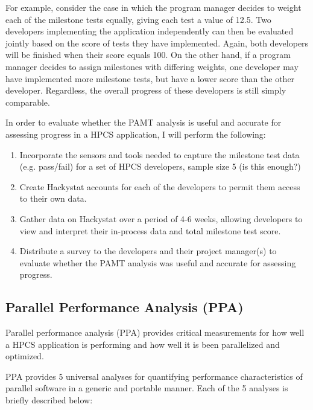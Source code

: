 \documentclass[11pt,twocolumn]{article}
\begin{document}
For example, consider the case in which the program manager decides to
weight each of the milestone tests equally, giving each test a value
of 12.5.  Two developers implementing the application independently
can then be evaluated jointly based on the score of tests they have
implemented.  Again, both developers will be finished when their score
equals 100.  On the other hand, if a program manager decides to assign
milestones with differing weights, one developer may have implemented
more milestone tests, but have a lower score than the other developer.
Regardless, the overall progress of these developers is still simply
comparable.

In order to evaluate whether the PAMT analysis is useful and accurate
for assessing progress in a HPCS application, I will perform the
following:

\begin{enumerate}
\item 
Incorporate the sensors and tools needed to capture the milestone test
data (e.g. pass/fail) for a set of HPCS developers, sample size 5 (is
this enough?)

\item 
Create Hackystat accounts for each of the developers to permit them
access to their own data.

\item 
Gather data on Hackystat over a period of 4-6 weeks, allowing
developers to view and interpret their in-process data and total
milestone test score.

\item 
Distribute a survey to the developers and their project manager(s) to
evaluate whether the PAMT analysis was useful and accurate for
assessing progress.
\end{enumerate}

\subsection {Parallel Performance Analysis (PPA)}

Parallel performance analysis (PPA) provides critical measurements for
how well a HPCS application is performing and how well it is been
parallelized and optimized.

PPA provides 5 universal analyses for quantifying performance
characteristics of parallel software in a generic and portable manner.
Each of the 5 analyses is briefly described below:
\end{document}
